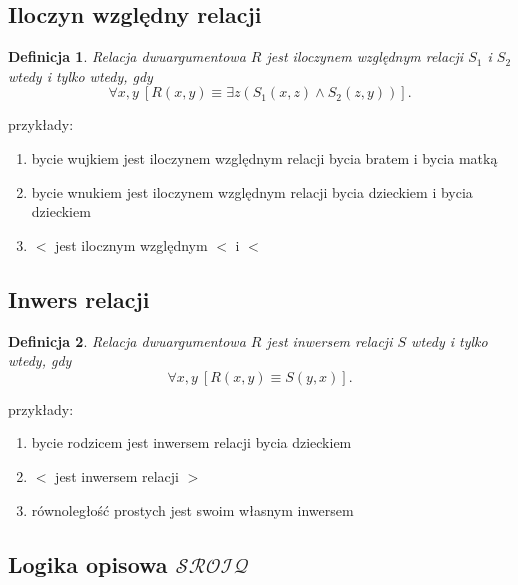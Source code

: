 \documentclass[12pt]{article}
\newtheorem{definicja}{Definicja}
\newcommand {\SROIQ} {\ensuremath{\mathcal{SROIQ}}}
\begin{document}
\subsection{Iloczyn względny relacji}
%
\begin{definicja}
Relacja dwuargumentowa $R$ jest \emph{iloczynem względnym relacji} $S_1$ i $S_2$ wtedy i tylko wtedy, gdy $$\forall x,y ~[R(x,y) \equiv \exists z (S_{1}(x,z) \land S_{2}(z,y))].$$
\end{definicja}
%
przykłady:
\begin{enumerate}
\item bycie wujkiem jest iloczynem względnym relacji bycia bratem i bycia matką
\item bycie wnukiem jest iloczynem względnym relacji bycia dzieckiem i bycia dzieckiem
\item $<$ jest ilocznym względnym $<$ i $<$
\end{enumerate}
%

%
\subsection{Inwers relacji}
%
\begin{definicja}
Relacja dwuargumentowa $R$ jest \emph{inwersem relacji} $S$ wtedy i tylko wtedy, gdy $$\forall x,y ~[R(x,y) \equiv S(y,x)].$$
\end{definicja}
%
przykłady:
\begin{enumerate}
\item bycie rodzicem jest inwersem relacji bycia dzieckiem
\item $<$ jest inwersem relacji $>$
\item równoległość prostych jest swoim własnym inwersem
\end{enumerate}
%


\subsection{Logika opisowa \SROIQ}
\end{document}
